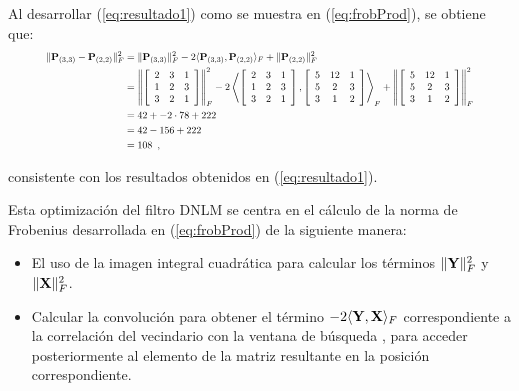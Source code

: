Al desarrollar (\ref{eq:resultado1}) como se muestra en (\ref{eq:frobProd}), se obtiene que: 
\begin{equation}\label{eq:matFrodProd}
\resizebox{.9 \textwidth}{!} 
{
$\begin{split}
\lVert \mat{P}_{\left(3,3\right)}-\mat{P}_{\left(2,2\right)}\rVert_{F} ^{2} & =\lVert \mat{P}_{\left(3,3\right)}\rVert_{F}^2 -2\langle\mat{P}_{\left(3,3\right)},\mat{P}_{\left(2,2\right)}\rangle_{F} + \lVert \mat{P}_{\left(2,2\right)}\rVert_{F}^2  \\
& = \left\Vert\left[\begin{array}{ccc}
2 & 3 & 1\\
1 & 2 & 3\\
3 & 2 & 1
\end{array}\right]\right\Vert_{F}^2-2\left\langle\left[\begin{array}{ccc}
2 & 3 & 1\\
1 & 2 & 3\\
3 & 2 & 1
\end{array}\right],\left[\begin{array}{ccc}
5 & 12 & 1\\
5 & 2 & 3\\
3 & 1 & 2
\end{array}\right]\right\rangle_{F}
+\left\Vert\left[\begin{array}{ccc}
5 & 12 & 1\\
5 & 2 & 3\\
3 & 1 & 2
\end{array}\right]\right\Vert_{F}^2 \\
& =42+-2\cdot78+222\\
& =42-156+222\\
& =108 \enspace ,
\end{split}$
}
\end{equation}


consistente con los resultados obtenidos en (\ref{eq:resultado1}).




Esta optimización del filtro DNLM se centra en el cálculo de la norma de Frobenius desarrollada en  (\ref{eq:frobProd}) de la siguiente manera:

\begin{itemize}
\item El uso de la imagen integral cuadrática para calcular los términos $\Vert \mathbf{Y} \Vert_{F}^2 $ y $\Vert \mathbf{X} \Vert_{F}^2 $.
\item Calcular la convolución para obtener el término $-2\langle\mathbf{Y},\mathbf{X}\rangle_{F} $
correspondiente a la correlación del vecindario  con la ventana de búsqueda \mat{\Omega}, para acceder posteriormente al elemento de la matriz resultante en la posici\'on correspondiente.
\end{itemize}

